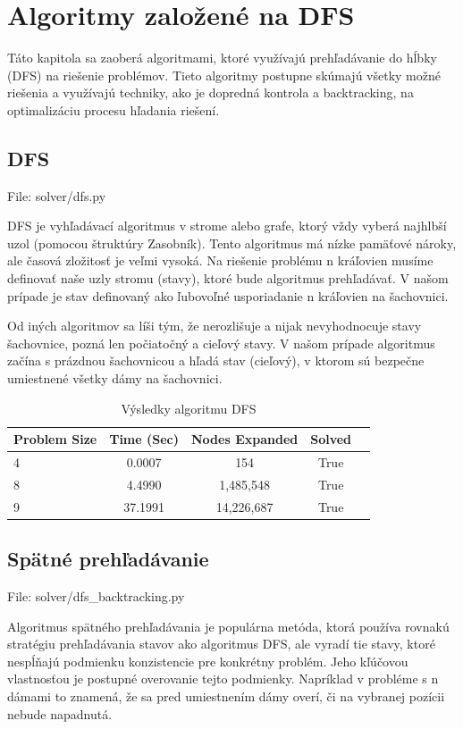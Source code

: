 
\chapter{Algoritmy založené na DFS}

Táto kapitola sa zaoberá algoritmami, ktoré využívajú prehľadávanie do hĺbky (DFS) na riešenie problémov. Tieto algoritmy postupne skúmajú všetky možné riešenia a využívajú techniky, ako je dopredná kontrola a backtracking, na optimalizáciu procesu hľadania riešení.

\section*{DFS}
File: solver/dfs.py

DFS je vyhľadávací algoritmus v strome alebo grafe, ktorý vždy vyberá najhlbší uzol (pomocou štruktúry Zasobník). Tento algoritmus má nízke pamäťové nároky, ale časová zložitosť je veľmi vysoká. Na riešenie problému n kráľovien musíme definovať naše uzly stromu (stavy), ktoré bude algoritmus prehľadávať. V našom prípade je stav definovaný ako ľubovoľné usporiadanie n kráľovien na šachovnici.

Od iných algoritmov sa líši tým, že  nerozlišuje a nijak nevyhodnocuje stavy šachovnice, pozná len počiatočný a cieľový stavy. V našom prípade algoritmus začína s prázdnou šachovnicou a hľadá stav (cieľový), v ktorom sú bezpečne umiestnené všetky dámy na šachovnici.
\begin{table}[h!]
    \centering
    \begin{tabular}{|l|c|c|c|c|}
        \hline
        \textbf{Problem Size} & \textbf{Time (Sec)} & \textbf{Nodes Expanded} & \textbf{Solved} \\
        \hline
        4 & 0.0007 & 154 & True \\
        8 & 4.4990 & 1,485,548 & True \\
        9 & 37.1991 & 14,226,687 & True \\
        \hline
    \end{tabular}
    \caption{Výsledky algoritmu DFS}
    \label{tab:dfs_results}
\end{table}
\section*{Spätné prehľadávanie}
File: solver/dfs\_backtracking.py

Algoritmus spätného prehľadávania je populárna metóda, ktorá používa rovnakú stratégiu prehľadávania stavov ako algoritmus DFS, ale vyradí tie stavy, ktoré nespĺňajú podmienku konzistencie pre konkrétny problém. Jeho kľúčovou vlastnosťou je postupné overovanie tejto podmienky. Napríklad v probléme s n dámami to znamená, že sa pred umiestnením dámy overí, či na vybranej pozícii nebude napadnutá.

